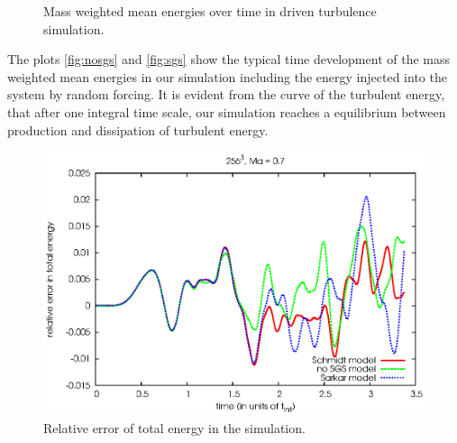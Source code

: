\begin{figure}[tp]
\centering
{}
\caption{Mass weighted mean energies over time in driven turbulence simulation.}
\end{figure}

The plots \ref{fig:nosgs} and \ref{fig:sgs} show the typical time development of
the mass weighted mean energies in our simulation including the energy injected
into the system by random forcing. It is evident from the curve of the turbulent
energy, that after one integral time scale, our simulation reaches a equilibrium
between production and dissipation of turbulent energy.

\begin{figure}[tp]
\centering
\includegraphics[width=0.7\linewidth]{chapter7/relerror2.eps}
\caption{Relative error of total energy in the simulation.}
\label{fig:relerror}
\end{figure}

